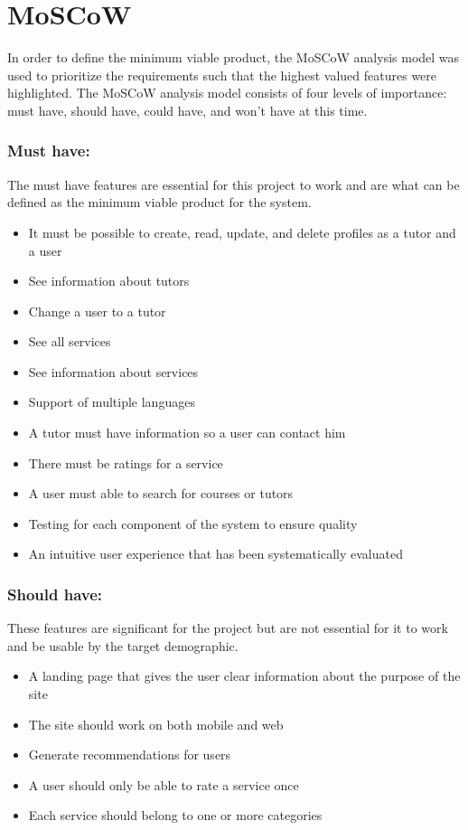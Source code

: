 \section{MoSCoW}\label{sec:moscow}
In order to define the minimum viable product, the MoSCoW analysis model was used to prioritize the requirements such that the highest valued features were highlighted.
The MoSCoW analysis model consists of four levels of importance: must have, should have, could have, and won't have at this time.

\subsubsection{Must have:}
The must have features are essential for this project to work and are what can be defined as the minimum viable product for the system.

\begin{itemize}
    \item It must be possible to create, read, update, and delete profiles as a tutor and a user
    \item See information about tutors
    \item Change a user to a tutor
    \item See all services
    \item See information about services
    \item Support of multiple languages
    \item A tutor must have information so a user can contact him
    \item There must be ratings for a service
    \item A user must able to search for courses or tutors
    \item Testing for each component of the system to ensure quality
    \item An intuitive user experience that has been systematically evaluated
\end{itemize}

\subsubsection{Should have:}
These features are significant for the project but are not essential for it to work and be usable by the target demographic.

\begin{itemize}
    \item A landing page that gives the user clear information about the purpose of the site
    \item The site should work on both mobile and web
    \item Generate recommendations for users
    \item A user should only be able to rate a service once
    \item Each service should belong to one or more categories
\end{itemize}

